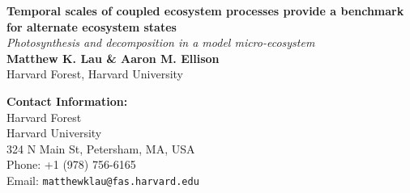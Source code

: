 \documentclass[a0,landscape]{a0poster}
\begin{document}



\begin{minipage}[b]{0.65\linewidth}
\veryHuge \color{Red} \textbf{Temporal scales of coupled ecosystem
  processes provide a benchmark for alternate ecosystem states}
\color{Black}\\ %
\Huge\textit{Photosynthesis and decomposition in a model micro-ecosystem}\\[1cm] %
\huge \textbf{Matthew K. Lau \& Aaron M. Ellison}\\ %
\huge Harvard Forest, Harvard University \\ %
\end{minipage}
%
\begin{minipage}[b]{0.20\linewidth}
\color{DarkSlateGray}\Large \textbf{Contact Information:}\\ 
Harvard Forest\\ %
Harvard University\\ 324 N Main St, Petersham, MA, USA\\ 
Phone: +1 (978) 756-6165\\ %
Email: \texttt{matthewklau@fas.harvard.edu}\\ %
\end{minipage}
%
\end{document}
